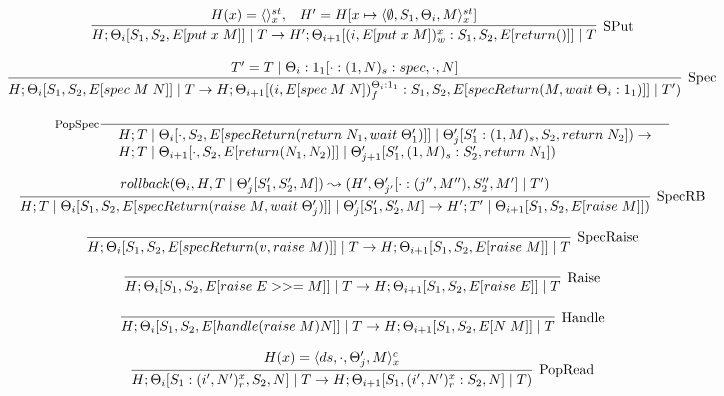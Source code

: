 \documentclass[9pt]{article}
\newcommand{\eval}[1]{E[#1]}
\begin{document}
\[%
\infer[\text{SPut}]{H; \Theta_i[S_1, S_2, \eval{put \; x \; M}] \; | \; T \rightarrow H'; \Theta_{i+1}[(i, \eval{put \; x \; M})_w^x : S_1, S_2, \eval{return()}] \; | \; T}{H(x) = \langle\rangle_x^{st}, \;\;\; H' = H[x \mapsto \langle \emptyset, S_1, \Theta_i, M\rangle_x^{st}]}
\]

\[ %
\infer[\text{Spec}]{H; \Theta_i[S_1, S_2, \eval{spec \; M \; N}] \; | \; T \rightarrow H; \Theta_{i+1}[(i, \eval{spec \; M \; N})_f^{\Theta_i : 1_1} : S_1, S_2, \eval{specReturn(M, wait \; \Theta_i : 1_1)}] \; | \; T')}{T' = T \; | \; \Theta_i : 1_1[\cdot : (1, N)_s : spec, \cdot, N]}
\]

\[%
\inference[\text{PopSpec}]{}{\begin{array}{l} H; T \; | \; \Theta_i[\cdot, S_2, \eval{specReturn(return \; N_1, wait \; \Theta_1')}] \; | \; \Theta_j'[S_1' : (1, M)_s, S_2, return \; N_2]) \rightarrow \\ H; T \; | \; \Theta_{i+1}[\cdot, S_2, \eval{return(N_1, N_2)}] \; | \; \Theta_{j+1}'[S_1', (1, M)_s : S_2', return \; N_1]) \end{array}}
\]


\[%
\infer[\text{SpecRB}]{H; T \; | \; \Theta_i[S_1, S_2, \eval{specReturn(raise \; M, wait \; \Theta_j')}] \; | \; \Theta_j'[S_1', S_2', M] \rightarrow H'; T' \; | \;  \Theta_{i+1}[S_1, S_2, \eval{raise \; M}])}{rollback(\Theta_i, H, T \; | \; \Theta_j'[S_1', S_2', M]) \leadsto (H', \Theta_{j'}'[\cdot : (j'', M''), S_2'', M'] \; | \; T')}
\]

\[%
\infer[\text{SpecRaise}]{H; \Theta_i[S_1, S_2, \eval{specReturn(v, raise \; M)}] \; | \; T \rightarrow H; \Theta_{i+1}[S_1, S_2, \eval{raise \; M}] \; | \; T}{}
\]

\[%
\infer[\text{Raise}]{H; \Theta_i[S_1, S_2, \eval{raise \; E >>= M}] \; | \; T \rightarrow H; \Theta_{i+1}[S_1, S_2, \eval{raise \; E}] \; | \; T}{}
\]

\[%
\infer[\text{Handle}]{H; \Theta_i[S_1, S_2, \eval{handle (raise \; M) N}] \; | \; T \rightarrow H; \Theta_{i+1}[S_1, S_2, \eval{N \; M}] \; | \; T}{}
\]

\[%
\infer[\text{PopRead}]{H; \Theta_i[S_1 : (i', N')_r^x, S_2, N] \; | \; T \rightarrow H; \Theta_{i+1}[S_1, (i', N')_r^x : S_2, N] \; | \; T)}{H(x) = \langle ds, \cdot, \Theta_j', M\rangle_x^c}
\]
\end{document}

